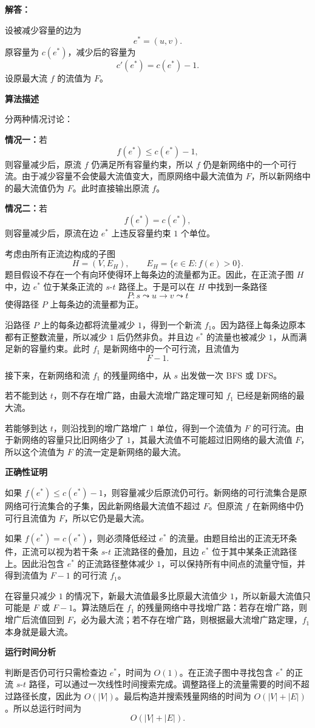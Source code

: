 \documentclass[12pt,a4paper]{article}
\begin{document}
\begin{answerbox}
\textbf{解答：}

设被减少容量的边为
\[
  e^*=(u,v).
\]
原容量为 $c(e^*)$，减少后的容量为
\[
  c'(e^*)=c(e^*)-1.
\]
设原最大流 $f$ 的流值为 $F$。

\textbf{算法描述}

分两种情况讨论：

\textbf{情况一：}若
\[
  f(e^*)\le c(e^*)-1,
\]
则容量减少后，原流 $f$ 仍满足所有容量约束，所以 $f$ 仍是新网络中的一个可行流。由于减少容量不会使最大流值变大，而原网络中最大流值为 $F$，所以新网络中的最大流值仍为 $F$。此时直接输出原流 $f$。

\textbf{情况二：}若
\[
  f(e^*)=c(e^*),
\]
则容量减少后，原流在边 $e^*$ 上违反容量约束 $1$ 个单位。

考虑由所有正流边构成的子图
\[
  H=(V,E_H),\qquad E_H=\{e\in E:f(e)>0\}.
\]
题目假设不存在一个有向环使得环上每条边的流量都为正。因此，在正流子图 $H$ 中，边 $e^*$ 位于某条正流的 $s$-$t$ 路径上。于是可以在 $H$ 中找到一条路径
\[
  P:s\leadsto u\to v\leadsto t
\]
使得路径 $P$ 上每条边的流量都为正。

沿路径 $P$ 上的每条边都将流量减少 $1$，得到一个新流 $f_1$。因为路径上每条边原本都有正整数流量，所以减少 $1$ 后仍然非负。并且边 $e^*$ 的流量也被减少 $1$，从而满足新的容量约束。此时 $f_1$ 是新网络中的一个可行流，且流值为
\[
  F-1.
\]

接下来，在新网络和流 $f_1$ 的残量网络中，从 $s$ 出发做一次 BFS 或 DFS。

若不能到达 $t$，则不存在增广路，由最大流增广路定理可知 $f_1$ 已经是新网络的最大流。

若能够到达 $t$，则沿找到的增广路增广 $1$ 单位，得到一个流值为 $F$ 的可行流。由于新网络的容量只比旧网络少了 $1$，其最大流值不可能超过旧网络的最大流值 $F$，所以这个流值为 $F$ 的流一定是新网络的最大流。

\textbf{正确性证明}

如果 $f(e^*)\le c(e^*)-1$，则容量减少后原流仍可行。新网络的可行流集合是原网络可行流集合的子集，因此新网络最大流值不超过 $F$。但原流 $f$ 在新网络中仍可行且流值为 $F$，所以它仍是最大流。

如果 $f(e^*)=c(e^*)$，则必须降低经过 $e^*$ 的流量。由题目给出的正流无环条件，正流可以视为若干条 $s$-$t$ 正流路径的叠加，且边 $e^*$ 位于其中某条正流路径上。因此沿包含 $e^*$ 的正流路径整体减少 $1$，可以保持所有中间点的流量守恒，并得到流值为 $F-1$ 的可行流 $f_1$。

在容量只减少 $1$ 的情况下，新最大流值最多比原最大流值少 $1$，所以新最大流值只可能是 $F$ 或 $F-1$。算法随后在 $f_1$ 的残量网络中寻找增广路：若存在增广路，则增广后流值回到 $F$，必为最大流；若不存在增广路，则根据最大流增广路定理，$f_1$ 本身就是最大流。

\textbf{运行时间分析}

判断是否仍可行只需检查边 $e^*$，时间为 $O(1)$。在正流子图中寻找包含 $e^*$ 的正流 $s$-$t$ 路径，可以通过一次线性时间搜索完成。调整路径上的流量需要的时间不超过路径长度，因此为 $O(|V|)$。最后构造并搜索残量网络的时间为 $O(|V|+|E|)$。所以总运行时间为
\[
  O(|V|+|E|).
\]

\end{answerbox}
\end{document}
